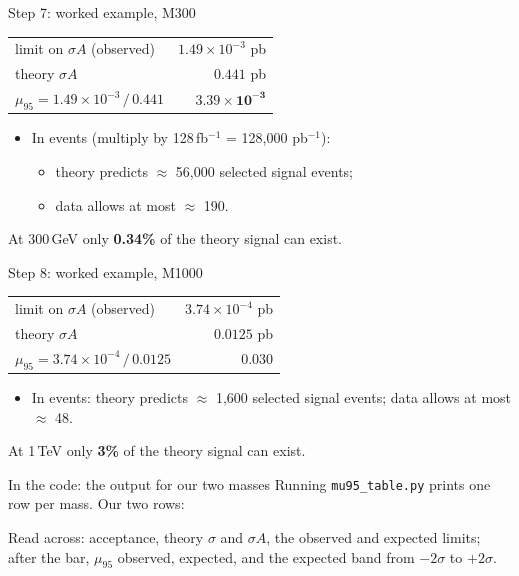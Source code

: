 \documentclass[aspectratio=169,12pt]{beamer}
\newcommand{\codesource}[1]{\par\vspace{0.2em}{\tiny\color{softgray} from #1}\par}
\newcommand{\takeaway}[1]{\vfill
  \colorbox{boxbg}{\parbox{0.96\textwidth}{\centering\vspace{0.3em}#1\vspace{0.3em}}}
  \par\vspace{0.6em}}
\begin{document}
\begin{frame}{Step 7: worked example, M300}
  \centering
  \begin{tabular}{lr}
    \toprule
    limit on $\sigma A$ (observed) & $1.49 \times 10^{-3}$ pb \\
    theory $\sigma A$             & $0.441$ pb \\
    \midrule
    $\mu_{95} = 1.49\times10^{-3} \,/\, 0.441$ & $\mathbf{3.39 \times 10^{-3}}$ \\
    \bottomrule
  \end{tabular}
  \vspace{1em}
  \begin{itemize}
    \item In events (multiply by 128\,fb$^{-1}$ = 128{,}000 pb$^{-1}$):
      \begin{itemize}
        \item theory predicts $\approx$ 56{,}000 selected signal events;
        \item data allows at most $\approx$ 190.
      \end{itemize}
  \end{itemize}
  \takeaway{At 300\,GeV only \textbf{0.34\%} of the theory signal can exist.}
\end{frame}

\begin{frame}{Step 8: worked example, M1000}
  \centering
  \begin{tabular}{lr}
    \toprule
    limit on $\sigma A$ (observed) & $3.74 \times 10^{-4}$ pb \\
    theory $\sigma A$             & $0.0125$ pb \\
    \midrule
    $\mu_{95} = 3.74\times10^{-4} \,/\, 0.0125$ & $\mathbf{0.030}$ \\
    \bottomrule
  \end{tabular}
  \vspace{1em}
  \begin{itemize}
    \item In events: theory predicts $\approx$ 1{,}600 selected signal events;
          data allows at most $\approx$ 48.
  \end{itemize}
  \takeaway{At 1\,TeV only \textbf{3\%} of the theory signal can exist.}
\end{frame}

\begin{frame}{In the code: the output for our two masses}
  Running \texttt{mu95\_table.py} prints one row per mass. Our two rows:
  \vspace{0.4em}
  {\sniplimitout}
  \codesource{\srclimitout}
  \takeaway{Read across: acceptance, theory $\sigma$ and $\sigma A$, the observed
  and expected limits; after the bar, $\mu_{95}$ observed, expected, and the
  expected band from $-2\sigma$ to $+2\sigma$.}
\end{frame}
\end{document}
